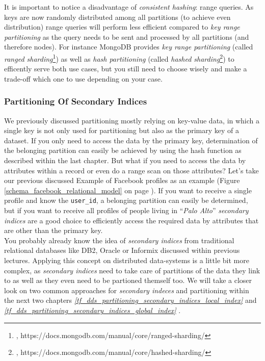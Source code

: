 {It is important to notice a disadvantage of \textit{consistent hashing}: range queries. As keys are now randomly distributed among all partitions (to achieve even distribution) range queries will perform less efficient compared to \textit{key range partitioning} as the query needs to be sent and processed by all partitions (and therefore nodes). For instance MongoDB provides \textit{key range partitioning} (called \textit{ranged sharding}\footnote{\cite{MDBRS}, https://docs.mongodb.com/manual/core/ranged-sharding/}) as well as \textit{hash partitioning} (called \textit{hashed sharding}\footnote{\cite{MDBHS}, https://docs.mongodb.com/manual/core/hashed-sharding/}) to efficently serve both use cases, but you still need to choose wisely and make a trade-off which one to use depending on your case.\\

\newpage

\subsubsection{Partitioning Of Secondary Indices}
\label{tf_dds_partitioning_secondary_indices}

We previously discussed partitioning mostly relying on key-value data, in which a single key is not only used for partitioning but also as the primary key of a dataset. If you only need to access the data by the primary key, determination of the belonging partition can easily be achieved by using the hash function as described within the last chapter. But what if you need to access the data by attributes within a record or even do a range scan on those attributes? Let's take our previous discussed Example of Facebook profiles as an example (Figure \ref{schema_facebook_relational_model} on page \pageref{schema_facebook_relational_model}). If you want to receive a single profile and know the \lstinline{user_id}, a belonging partition can easily be determined, but if you want to receive all profiles of people living in ``\textit{Palo Alto}'' \textit{secondary indices} are a good choice to efficiently access the required data by attributes that are other than the primary key. \\
You probably already know the idea of \textit{secondary indices} from traditional relational databases like DB2, Oracle or Informix discussed within previous lectures. Applying this concept on distributed data-systems is a little bit more complex, as \textit{secondary indices} need to take care of partitions of the data they link to as well as they even need to be partioned themself too. We will take a closer look on two common approaches for \textit{secondary indeces} and partitioning within the next two chapters \textit{\ref{tf_dds_partitioning_secondary_indices_local_index} } and \textit{\ref{tf_dds_partitioning_secondary_indices_global_index} }.

}
